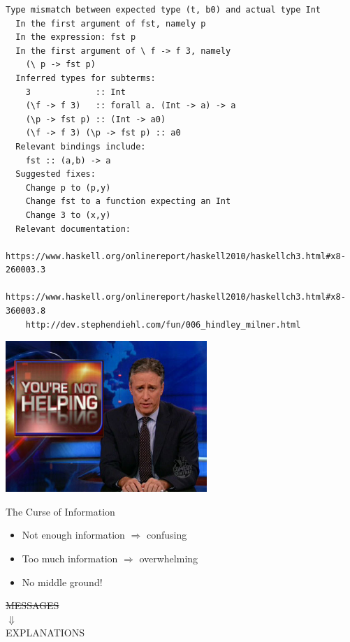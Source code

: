 \documentclass[xcolor=svgnames,12pt,aspectratio=169]{beamer}
\newenvironment{xframe}[1][]
  {\begin{frame}[fragile,environment=xframe,#1]}
  {\end{frame}}
\begin{document}
\begin{xframe}{}
\begin{center}
\begin{overprint}
\begin{Verbatim}[fontsize=\scriptsize]
Type mismatch between expected type (t, b0) and actual type Int
  In the first argument of fst, namely p
  In the expression: fst p
  In the first argument of \ f -> f 3, namely
    (\ p -> fst p)
  Inferred types for subterms:
    3             :: Int
    (\f -> f 3)   :: forall a. (Int -> a) -> a
    (\p -> fst p) :: (Int -> a0)
    (\f -> f 3) (\p -> fst p) :: a0
  Relevant bindings include:
    fst :: (a,b) -> a
  Suggested fixes:
    Change p to (p,y)
    Change fst to a function expecting an Int
    Change 3 to (x,y)
  Relevant documentation:
    https://www.haskell.org/onlinereport/haskell2010/haskellch3.html#x8-260003.3
    https://www.haskell.org/onlinereport/haskell2010/haskellch3.html#x8-360003.8
    http://dev.stephendiehl.com/fun/006_hindley_milner.html
\end{Verbatim}
\end{overprint}
\end{center}
\end{xframe}

\begin{xframe}{}
  \begin{center}
    \includegraphics[width=3in]{not-helping.jpg}
  \end{center}
\end{xframe}

\begin{xframe}{The Curse of Information}
  \begin{itemize}
  \item<+-> Not enough information $\Rightarrow$ confusing
  \item<+-> Too much information $\Rightarrow$ overwhelming
  \item<+-> No middle ground!
  \end{itemize}
\end{xframe}

\begin{xframe}{}
  \Large
  \begin{center}
    \sout{MESSAGES} \\
    $\Downarrow$ \\
    EXPLANATIONS
  \end{center}
\end{xframe}
\end{document}
